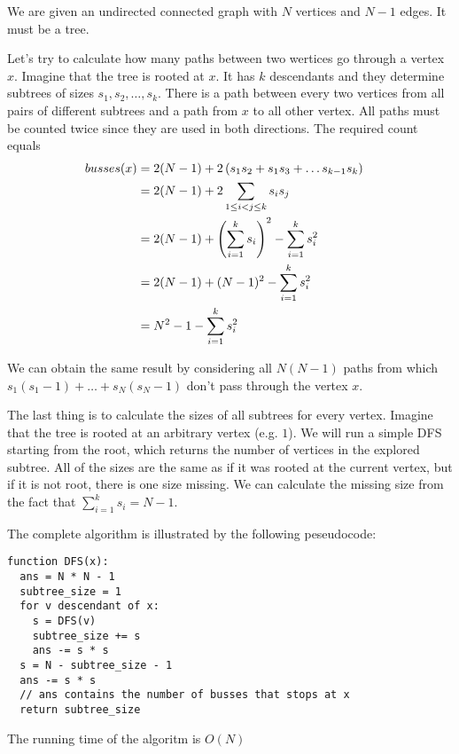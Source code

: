 
We are given an undirected connected graph with $N$ vertices and $N - 1$ edges.
It must be a tree.

Let's try to calculate how many paths between two wertices go through a vertex $x$.
Imagine that the tree is rooted at $x$. It has $k$ descendants and they determine subtrees
of sizes $s_1, s_2, \dots, s_k$.
There is a path between every two vertices from all pairs of
different subtrees and a path from $x$ to all other vertex. All paths must be counted
twice since they are used in both directions.
The required count equals
\begin{align*}
busses(x) &= 2(N - 1) + 2\left(s_1s_2 + s_1s_3 + \dots s_{k - 1}s_k\right) \cr
          &= 2(N - 1) + 2\sum_{1\le i < j \le k} s_i s_j \cr
          &= 2(N - 1) + \left(\sum_{i = 1}^k s_i\right)^2 - \sum_{i = 1}^k s_i^2 \cr
          &= 2(N - 1) + (N - 1)^2 - \sum_{i = 1}^k s_i^2 \cr
          &= N^2 - 1 - \sum_{i = 1}^k s_i^2 \cr
\end{align*}

We can obtain the same result by considering all $N(N - 1)$ paths from which
$s_1(s_1 - 1) + \dots + s_N(s_N - 1)$ don't pass through the vertex $x$.

The last thing is to calculate the sizes of all subtrees for every vertex.
Imagine that the tree is rooted at an arbitrary vertex (e.g. $1$).
We will run a simple DFS starting from the root, which returns the number of vertices
in the explored subtree. All of the sizes are the same as if it was rooted at the
current vertex, but if it is not root, there is one size missing. We can calculate
the missing size from the fact that $\sum_{i=1}^k s_i = N - 1$.

The complete algorithm is illustrated by the following peseudocode:

\begin{lstlisting}
function DFS(x):
  ans = N * N - 1
  subtree_size = 1
  for v descendant of x:
    s = DFS(v)
    subtree_size += s
    ans -= s * s
  s = N - subtree_size - 1
  ans -= s * s
  // ans contains the number of busses that stops at x
  return subtree_size
\end{lstlisting}

The running time of the algoritm is $O(N)$
